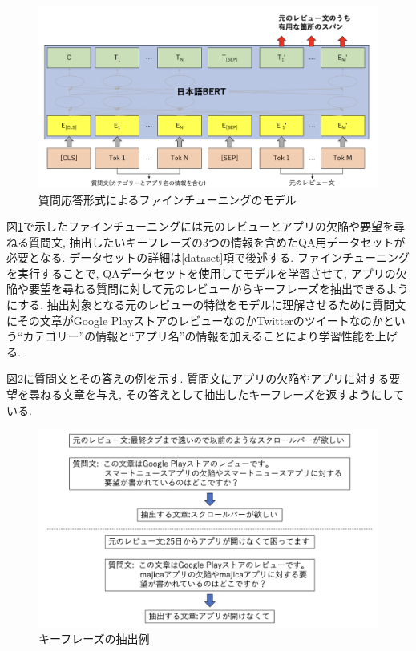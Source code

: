 \begin{figure}[H]
  \centering
  \includegraphics[scale=0.3]
    {contents/images/fine-tuning.png}
  \caption{質問応答形式によるファインチューニングのモデル\label{fig:fine-tuning}}
\end{figure}
\noindent
図\ref{fig:fine-tuning}で示したファインチューニングには元のレビューとアプリの欠陥や要望を尋ねる質問文, 抽出したいキーフレーズの3つの情報を含めたQA用データセットが必要となる. データセットの詳細は\ref{dataset}項で後述する. 
ファインチューニングを実行することで, QAデータセットを使用してモデルを学習させて, アプリの欠陥や要望を尋ねる質問に対して元のレビューからキーフレーズを抽出できるようにする. %
抽出対象となる元のレビューの特徴をモデルに理解させるために質問文にその文章がGoogle PlayストアのレビューなのかTwitterのツイートなのかという``カテゴリー''の情報と``アプリ名''の情報を加えることにより学習性能を上げる. 

図\ref{fig:answer}に質問文とその答えの例を示す. 質問文にアプリの欠陥やアプリに対する要望を尋ねる文章を与え, その答えとして抽出したキーフレーズを返すようにしている. 

\begin{figure}[H]
  \centering
  \includegraphics[scale=0.4]
       {contents/images/answer.png}
  \caption{キーフレーズの抽出例\label{fig:answer}}
\end{figure}

